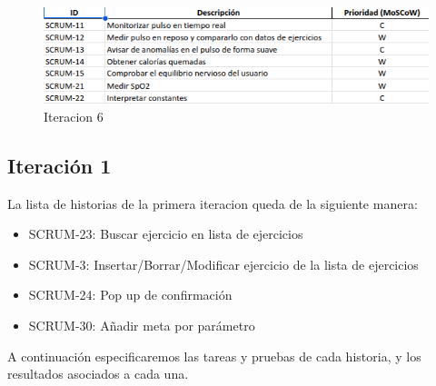 \begin{figure}[H]
   \centering
    \includegraphics[width=1.25\textwidth]{tablas/iter6.png}
    \caption{Iteracion 6}
    \label{fig:iter6}
\end{figure}

\subsection{Iteración 1}
La lista de historias de la primera iteracion queda de la siguiente manera:

\begin{itemize}
    \item SCRUM-23: Buscar ejercicio en lista de ejercicios
    \item SCRUM-3: Insertar/Borrar/Modificar ejercicio de la lista de ejercicios
    \item SCRUM-24: Pop up de confirmación
    \item SCRUM-30: Añadir meta por parámetro
\end{itemize}

A continuación especificaremos las tareas y pruebas de cada historia, y los resultados asociados a cada una. 


